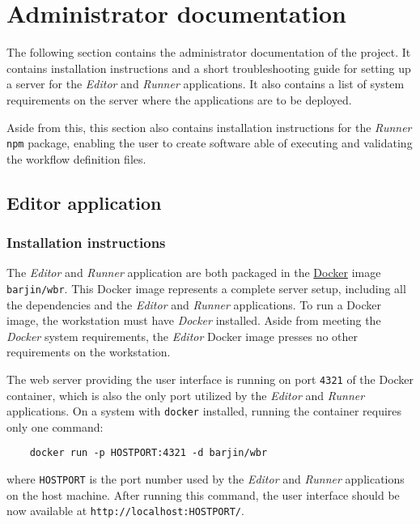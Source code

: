 
\section{Administrator documentation} \label{adminDocs}

The following section contains the administrator documentation of the project.
It contains installation instructions and a short troubleshooting guide for setting up a server for the \textit{Editor} and \textit{Runner} applications. 
It also contains a list of system requirements on the server where the applications are to be deployed.

Aside from this, this section also contains installation instructions for the \textit{Runner} \texttt{npm} package, enabling the user to create software able of executing and validating the workflow definition files.

\subsection{Editor application}


\subsubsection{Installation instructions}

The \textit{Editor} and \textit{Runner} application are both packaged in the \href{https://www.docker.com/}{Docker} image \texttt{barjin/wbr}.
This Docker image represents a complete server setup, including all the dependencies and the \textit{Editor} and \textit{Runner} applications.
To run a Docker image, the workstation must have \textit{Docker} installed. 
Aside from meeting the \textit{Docker} system requirements, the \textit{Editor} Docker image presses no other requirements on the workstation.

The web server providing the user interface is running on port \texttt{4321} of the Docker container, which is also the only port utilized by the \textit{Editor} and \textit{Runner} applications.
On a system with \texttt{docker} installed, running the container requires only one command:

\begin{verbatim}
    docker run -p HOSTPORT:4321 -d barjin/wbr
\end{verbatim}
where \texttt{HOSTPORT} is the port number used by the \textit{Editor} and \textit{Runner} applications on the host machine.
After running this command, the user interface should be now available at \texttt{http://localhost:HOSTPORT/}.

